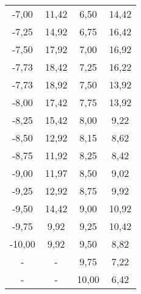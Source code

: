 \begin{table}[h!]
\begin{tabular}{c c c c}
   -7,00		& 11,42& 6,50		& 14,42\\
   -7,25		& 14,92& 6,75		& 16,42\\
   -7,50		& 17,92& 7,00		& 16,92\\
   -7,73		& 18,42& 7,25		& 16,22\\
   -7,73		& 18,92& 7,50		& 13,92\\
   -8,00		& 17,42& 7,75		& 13,92\\
   -8,25		& 15,42& 8,00		& 9,22\\
   -8,50		& 12,92& 8,15		& 8,62\\
   -8,75		& 11,92& 8,25		& 8,42\\
   -9,00		& 11,97& 8,50		& 9,02\\
   -9,25		& 12,92& 8,75		& 9,92\\
   -9,50		& 14,42& 9,00		& 10,92\\
   -9,75		& 9,92& 9,25		& 10,42\\
   -10,00		& 9,92& 9,50		& 8,82\\
   -        &   - & 9,75		& 7,22\\
   -        &   - & 10,00	& 6,42\\



   \bottomrule
\end{tabular}
\end{table}
